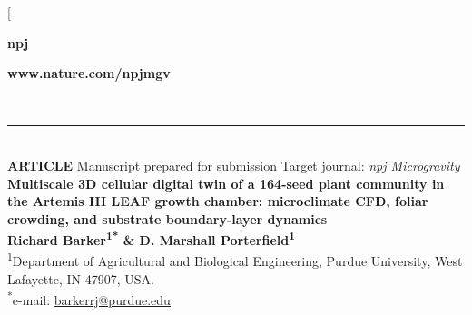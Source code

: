 \documentclass[10pt,twocolumn,twoside]{article}
\begin{document}
\twocolumn[{
  \thispagestyle{firstpage}
  \begin{flushleft}
    \noindent
    \begin{minipage}[b]{0.65\textwidth}
      {\fontsize{24bp}{26bp}\selectfont\sffamily\bfseries npj}\hspace{7pt}{\fontsize{22bp}{24bp}\selectfont\sffamily\mdseries \raisebox{1pt}{\Large\textbar}}
    \end{minipage}%
    \hfill
    \begin{minipage}[b]{0.33\textwidth}
      \raggedleft
      {\fontsize{9bp}{11bp}\selectfont\sffamily \textbf{www.nature.com/npjmgv}}
    \end{minipage}\\[2pt]
    \noindent\rule{\textwidth}{1.2pt}\\[6pt]

    \noindent
    {\fontsize{9bp}{11bp}\selectfont\sffamily\textbf{\color{npjred}ARTICLE}}\hspace{8pt}%
    \hspace{8pt}%
    {\fontsize{8bp}{10bp}\selectfont\sffamily\color{npjgray}Manuscript prepared for submission}\hfill%
    {\fontsize{8bp}{10bp}\selectfont\sffamily\color{npjgray}Target journal: \textit{npj Microgravity}}\\[10pt]

    \noindent
    {\fontsize{18bp}{22bp}\selectfont\sffamily\bfseries Multiscale 3D cellular digital twin of a 164-seed plant community in the Artemis III LEAF growth chamber: microclimate CFD, foliar crowding, and substrate boundary-layer dynamics}\\[10pt]

    \noindent
    {\fontsize{10.5bp}{13bp}\selectfont\sffamily\bfseries Richard Barker\textsuperscript{1*} \& D. Marshall Porterfield\textsuperscript{1}}\\[4pt]

    \noindent
    {\fontsize{8.5bp}{11bp}\selectfont\sffamily\color{npjdark}
    \textsuperscript{1}Department of Agricultural and Biological Engineering, Purdue University, West Lafayette, IN 47907, USA.\\
    \textsuperscript{*}e-mail: \href{mailto:barkerrj@purdue.edu}{barkerrj@purdue.edu}}\\[6pt]


\end{flushleft}}
\end{document}
